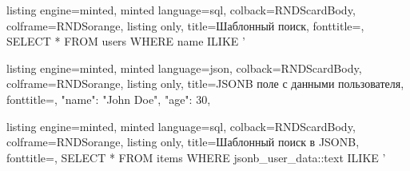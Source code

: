 \begin{frame}[fragile, t]
  \begin{tcblisting}{
    listing engine=minted,
    minted language=sql,
    colback=RNDScardBody,
    colframe=RNDSorange,
    listing only,
    title=Шаблонный поиск,
    fonttitle=\normalsize,
  }
  SELECT * FROM users WHERE name ILIKE '%
  \end{tcblisting}

  \begin{tcblisting}{
    listing engine=minted,
    minted language=json,
    colback=RNDScardBody,
    colframe=RNDSorange,
    listing only,
    title=JSONB поле с данными пользователя,
    fonttitle=\normalsize,
  }
  {
    "name": "John Doe",
    "age": 30,
  }
  \end{tcblisting}
  
  \begin{tcblisting}{
    listing engine=minted,
    minted language=sql,
    colback=RNDScardBody,
    colframe=RNDSorange,
    listing only,
    title=Шаблонный поиск в JSONB,
    fonttitle=\normalsize,
  }
  SELECT * FROM items WHERE jsonb_user_data::text ILIKE '%
  \end{tcblisting}
\end{frame}